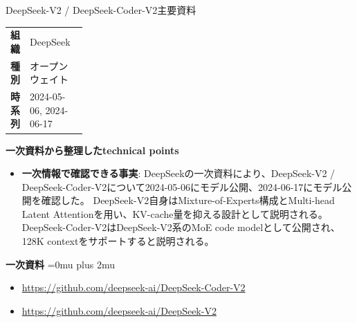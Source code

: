 \Needspace{0.38\textheight}
\begin{technicalnote}{DeepSeek-V2 / DeepSeek-Coder-V2}{主要資料}
\begingroup
\begin{tabularx}{\linewidth}{@{}>{\bfseries}p{0.22\linewidth}X@{}}
組織 & DeepSeek \\
種別 & オープンウェイト \\
時系列 & 2024-05-06, 2024-06-17 \\
\end{tabularx}
\smallskip
\begin{minipage}{\linewidth}
{\bfseries 一次資料から整理したtechnical points}
\begin{itemize}[leftmargin=1.5em,itemsep=0.35em]
\item \textbf{一次情報で確認できる事実}: DeepSeekの一次資料により、DeepSeek-V2 / DeepSeek-Coder-V2について2024-05-06にモデル公開、2024-06-17にモデル公開を確認した。 DeepSeek-V2自身はMixture-of-Experts構成とMulti-head Latent Attentionを用い、KV-cache量を抑える設計として説明される。DeepSeek-Coder-V2はDeepSeek-V2系のMoE code modelとして公開され、128K contextをサポートすると説明される。
\end{itemize}
\begin{minipage}{\linewidth}
\begin{samepage}
{\bfseries 一次資料}
\begingroup\sloppy
\Urlmuskip=0mu plus 2mu\relax
\begin{itemize}[leftmargin=1.5em,itemsep=0.25em]
\item {\scriptsize\url{https://github.com/deepseek-ai/DeepSeek-Coder-V2}}
\item {\scriptsize\url{https://github.com/deepseek-ai/DeepSeek-V2}}
\end{itemize}
\endgroup
\end{samepage}
\end{minipage}
\end{minipage}
\endgroup
\end{technicalnote}
\medskip

